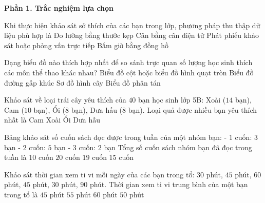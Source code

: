 \textbf{Phần 1. Trắc nghiệm lựa chọn}

\begin{ex} %
Khi thực hiện khảo sát sở thích của các bạn trong lớp, phương pháp thu thập dữ liệu phù hợp là
\choice
{Đo lường bằng thước kẹp}
{Cân bằng cân điện tử}
{\True Phát phiếu khảo sát hoặc phỏng vấn trực tiếp}
{Bấm giờ bằng đồng hồ}
\end{ex}

\begin{ex} %
Dạng biểu đồ nào thích hợp nhất để so sánh trực quan số lượng học sinh thích các môn thể thao khác nhau?
\choice
{\True Biểu đồ cột hoặc biểu đồ hình quạt tròn}
{Biểu đồ đường gấp khúc}
{Sơ đồ hình cây}
{Biểu đồ phân tán}
\end{ex}

\begin{ex} %
Khảo sát về loại trái cây yêu thích của $40$ bạn học sinh lớp 5B: Xoài ($14$ bạn), Cam ($10$ bạn), Ổi ($8$ bạn), Dưa hấu ($8$ bạn). Loại quả được nhiều bạn yêu thích nhất là
\choice
{Cam}
{\True Xoài}
{Ổi}
{Dưa hấu}
\end{ex}

\begin{ex} %
Bảng khảo sát số cuốn sách đọc được trong tuần của một nhóm bạn:
- $1$ cuốn: $3$ bạn
- $2$ cuốn: $5$ bạn
- $3$ cuốn: $2$ bạn
Tổng số cuốn sách nhóm bạn đã đọc trong tuần là
\choice
{$10$ cuốn}
{$20$ cuốn}
{\True $19$ cuốn}
{$15$ cuốn}
\end{ex}

\begin{ex} %
Khảo sát thời gian xem ti vi mỗi ngày của các bạn trong tổ: $30$ phút, $45$ phút, $60$ phút, $45$ phút, $30$ phút, $90$ phút. Thời gian xem ti vi trung bình của một bạn trong tổ là
\choice
{$45$ phút}
{$55$ phút}
{$60$ phút}
{\True $50$ phút}
\end{ex}

